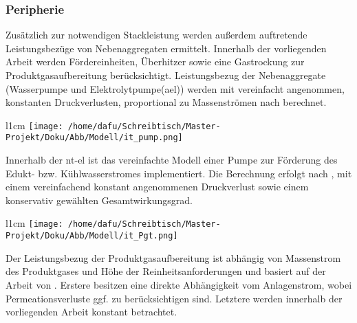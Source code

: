 \documentclass[onecolumn,10pt,titlepage]{article}
\begin{document}
\subsubsection{Peripherie}
\label{subsubs_mod_Periph}
Zusätzlich zur notwendigen Stackleistung werden außerdem auftretende Leistungsbezüge von Nebenaggregaten ermittelt. Innerhalb der vorliegenden Arbeit werden Fördereinheiten, Überhitzer sowie eine Gastrockung zur Produktgasaufbereitung berücksichtigt. 
Leistungsbezug der Nebenaggregate (Wasserpumpe und Elektrolytpumpe(\gls{ael})) werden mit vereinfacht angenommen, konstanten Druckverlusten, proportional zu Massenströmen nach \cite{KSB2005} berechnet.
\newline


\begin{wrapfigure}{l}{1cm}
	\texttt{[image: /home/dafu/Schreibtisch/Master-Projekt/Doku/Abb/Modell/it\_pump.png]}
\end{wrapfigure} 
Innerhalb der \gls{nt}-\gls{el} ist das vereinfachte Modell einer Pumpe zur Förderung des Edukt- bzw. Kühlwasserstromes implementiert. Die Berechnung erfolgt nach \cite{KSB2005} %
, mit einem vereinfachend konstant angenommenen Druckverlust sowie einem konservativ gewählten Gesamtwirkungsgrad.
\newline


\begin{wrapfigure}{l}{1cm}
	\texttt{[image: /home/dafu/Schreibtisch/Master-Projekt/Doku/Abb/Modell/it\_Pgt.png]}
\end{wrapfigure} Der Leistungsbezug der Produktgasaufbereitung ist abhängig von Massenstrom des Produktgases und Höhe der Reinheitsanforderungen und basiert auf der Arbeit von \cite{Tjarks2017}. Erstere besitzen eine direkte Abhängigkeit vom Anlagenstrom, wobei Permeationsverluste ggf. zu berücksichtigen sind. Letztere werden innerhalb der vorliegenden Arbeit konstant betrachtet. %
\newline

\end{document}
